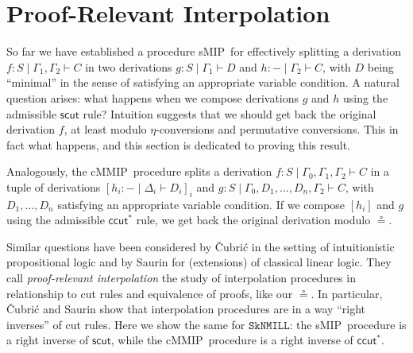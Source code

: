 \documentclass[sn-mathphys-num]{sn-jnl}%
\newcommand{\GG}{\Gamma}
\newcommand{\GD}{\Delta}
\newcommand{\vd}{\vdash}
\newcommand{\SkNMILL}{$\mathtt{SkNMILL}$}
\newcommand{\mf}[1]{\mathsf{#1}}
\newcommand{\sMIP}{\textsf{sMIP}}
\newcommand{\cMMIP}{\textsf{cMMIP}}
\theoremstyle{thmstyleone}%
\theoremstyle{thmstyletwo}%
\theoremstyle{thmstylethree}%
\begin{document}
\section{Proof-Relevant Interpolation}\label{sec:proof-rel} 

So far we have established a procedure \sMIP~for effectively splitting a derivation $f : S \mid \GG_1 , \GG_2 \vd C$ in two derivations $g : S \mid \GG_1 \vd D$ and $h : {-} \mid \GG_2 \vd C$, with $D$ being ``minimal'' in the sense of satisfying an appropriate variable condition.
A natural question arises: what happens when we compose derivations $g$ and $h$ using the admissible $\mathsf{scut}$ rule?
Intuition suggests that we should get back the original derivation $f$, at least modulo $\eta$-conversions and permutative conversions.
This in fact what happens, and this section is dedicated to proving this result.

Analogously, the \cMMIP~procedure splits a derivation $f : S \mid \GG_0,\GG_1,\GG_2 \vd C$ in a tuple of derivations $[h_i : {-} \mid \GD_i \vd D_i]_i$ and $g : S \mid \GG_0,D_1,\dots,D_n,\GG_2 \vd C$, with $D_1,\dots,D_n$ satisfying an appropriate variable condition.
If we compose $[h_i]$ and $g$ using the admissible $\mathsf{ccut^*}$ rule, we get back the original derivation modulo $\circeq$.

Similar questions have been considered by {\v{C}}ubri{\'c} \cite{Cubric1994} in the setting of intuitionistic propositional logic and by Saurin \cite{Saurin2024} for (extensions) of classical linear logic.
They call \emph{proof-relevant interpolation} the study of interpolation procedures in relationship to cut rules and equivalence of proofs, like our $\circeq$.
In particular, {\v{C}}ubri{\'c} and Saurin show that interpolation procedures are in a way ``right inverses'' of cut rules.
Here we show the same for \SkNMILL: the \sMIP~procedure is a right inverse of $\mf{scut}$, while the \cMMIP~procedure is a right inverse of $\mathsf{ccut^*}$. 
\end{document}
